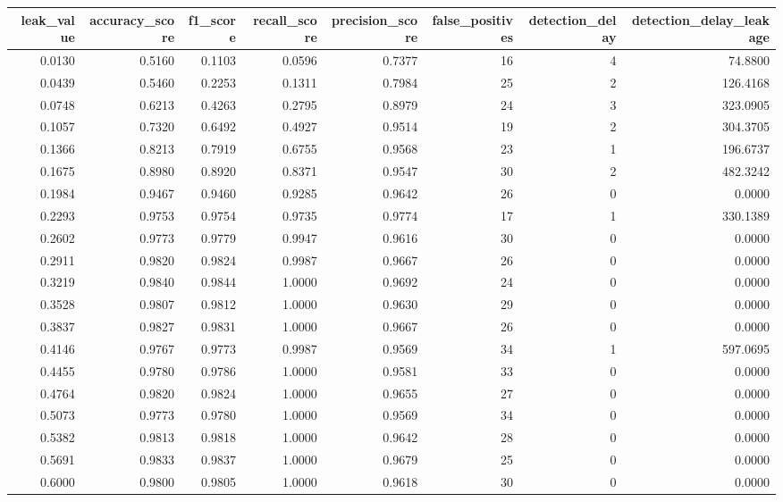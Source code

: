 \begin{tabular}{rrrrrrrr}
\toprule
leak\_value & accuracy\_score & f1\_score & recall\_score & precision\_score & false\_positives & detection\_delay & detection\_delay\_leakage \\
\midrule
0.0130 & 0.5160 & 0.1103 & 0.0596 & 0.7377 & 16 & 4 & 74.8800 \\
0.0439 & 0.5460 & 0.2253 & 0.1311 & 0.7984 & 25 & 2 & 126.4168 \\
0.0748 & 0.6213 & 0.4263 & 0.2795 & 0.8979 & 24 & 3 & 323.0905 \\
0.1057 & 0.7320 & 0.6492 & 0.4927 & 0.9514 & 19 & 2 & 304.3705 \\
0.1366 & 0.8213 & 0.7919 & 0.6755 & 0.9568 & 23 & 1 & 196.6737 \\
0.1675 & 0.8980 & 0.8920 & 0.8371 & 0.9547 & 30 & 2 & 482.3242 \\
0.1984 & 0.9467 & 0.9460 & 0.9285 & 0.9642 & 26 & 0 & 0.0000 \\
0.2293 & 0.9753 & 0.9754 & 0.9735 & 0.9774 & 17 & 1 & 330.1389 \\
0.2602 & 0.9773 & 0.9779 & 0.9947 & 0.9616 & 30 & 0 & 0.0000 \\
0.2911 & 0.9820 & 0.9824 & 0.9987 & 0.9667 & 26 & 0 & 0.0000 \\
0.3219 & 0.9840 & 0.9844 & 1.0000 & 0.9692 & 24 & 0 & 0.0000 \\
0.3528 & 0.9807 & 0.9812 & 1.0000 & 0.9630 & 29 & 0 & 0.0000 \\
0.3837 & 0.9827 & 0.9831 & 1.0000 & 0.9667 & 26 & 0 & 0.0000 \\
0.4146 & 0.9767 & 0.9773 & 0.9987 & 0.9569 & 34 & 1 & 597.0695 \\
0.4455 & 0.9780 & 0.9786 & 1.0000 & 0.9581 & 33 & 0 & 0.0000 \\
0.4764 & 0.9820 & 0.9824 & 1.0000 & 0.9655 & 27 & 0 & 0.0000 \\
0.5073 & 0.9773 & 0.9780 & 1.0000 & 0.9569 & 34 & 0 & 0.0000 \\
0.5382 & 0.9813 & 0.9818 & 1.0000 & 0.9642 & 28 & 0 & 0.0000 \\
0.5691 & 0.9833 & 0.9837 & 1.0000 & 0.9679 & 25 & 0 & 0.0000 \\
0.6000 & 0.9800 & 0.9805 & 1.0000 & 0.9618 & 30 & 0 & 0.0000 \\
\bottomrule
\end{tabular}
